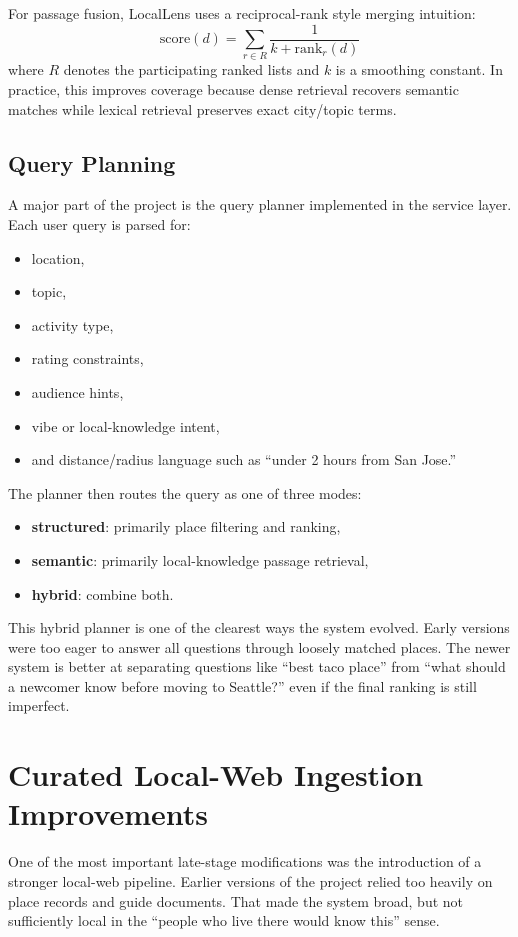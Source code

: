 \documentclass[11pt]{article}
\begin{document}
For passage fusion, LocalLens uses a reciprocal-rank style merging intuition:
\[
\mathrm{score}(d) = \sum_{r \in R} \frac{1}{k + \mathrm{rank}_r(d)}
\]
where $R$ denotes the participating ranked lists and $k$ is a smoothing constant. In practice, this improves coverage because dense retrieval recovers semantic matches while lexical retrieval preserves exact city/topic terms.

\subsection{Query Planning}
A major part of the project is the query planner implemented in the service layer. Each user query is parsed for:
\begin{itemize}[leftmargin=*]
    \item location,
    \item topic,
    \item activity type,
    \item rating constraints,
    \item audience hints,
    \item vibe or local-knowledge intent,
    \item and distance/radius language such as ``under 2 hours from San Jose.''
\end{itemize}

The planner then routes the query as one of three modes:
\begin{itemize}[leftmargin=*]
    \item \textbf{structured}: primarily place filtering and ranking,
    \item \textbf{semantic}: primarily local-knowledge passage retrieval,
    \item \textbf{hybrid}: combine both.
\end{itemize}

This hybrid planner is one of the clearest ways the system evolved. Early versions were too eager to answer all questions through loosely matched places. The newer system is better at separating questions like ``best taco place'' from ``what should a newcomer know before moving to Seattle?'' even if the final ranking is still imperfect.

\section{Curated Local-Web Ingestion Improvements}
One of the most important late-stage modifications was the introduction of a stronger local-web pipeline. Earlier versions of the project relied too heavily on place records and guide documents. That made the system broad, but not sufficiently local in the ``people who live there would know this'' sense.
\end{document}
